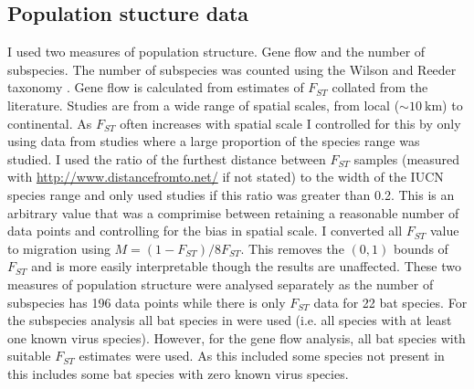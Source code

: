 \subsection{Population stucture data}

I used two measures of population structure. 
Gene flow and the number of subspecies.
The number of subspecies was counted using the Wilson and Reeder taxonomy \cite{wilson2005mammal}.
Gene flow is calculated from estimates of $F_{ST}$ collated from the literature.
Studies are from a wide range of spatial scales, from local ($\sim\SI{10}{\kilo\metre}$) to continental.
As $F_{ST}$ often increases with spatial scale \cite{burland1999population, hulva2010mechanisms, o2015genetic, vonhof2015range} I controlled for this by only using data from studies where a large proportion of the species range was studied.
I used the ratio of the furthest distance between $F_{ST}$ samples (measured with \url{http://www.distancefromto.net/} if not stated) to the width of the IUCN species range \cite{iucn} and only used studies if this ratio was greater than 0.2.
This is an arbitrary value that was a comprimise between retaining a reasonable number of data points and controlling for the bias in spatial scale.
I converted all $F_{ST}$ value to migration using $M = (1-F_{ST})/8F_{ST}$.
This removes the $(0, 1)$ bounds of $F_{ST}$ and is more easily interpretable though the results are unaffected. 
These two measures of population structure were analysed separately as the number of subspecies has 196 data points while there is only $F_{ST}$ data for 22 bat species.
For the subspecies analysis all bat species in \textcite{luis2013comparison} were used (i.e. all species with at least one known virus species).
However, for the gene flow analysis, all bat species with suitable $F_{ST}$ estimates were used.
As this included some species not present in \textcite{luis2013comparison} this includes some bat species with zero known virus species. 




























